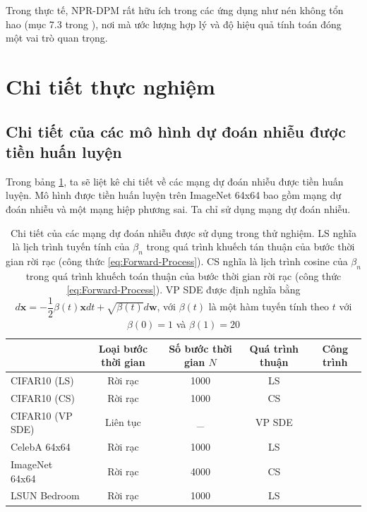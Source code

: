 \documentclass[14pt, a4paper]{article}
\numberwithin{equation}{section}
\numberwithin{figure}{section}
\numberwithin{dl}{section}
\numberwithin{md}{section}
\numberwithin{bd}{section}
\numberwithin{dn}{section}
\numberwithin{hq}{section}
\begin{document}
    Trong thực tế, NPR-DPM rất hữu ích trong các ứng dụng như nén không tổn hao (mục 7.3 trong \cite{kingma2021variational}),
    nơi mà ước lượng hợp lý và độ hiệu quả tính toán đóng một vai trò quan trọng.

    \section{Chi tiết thực nghiệm} \label{Experimental-Details}

    \subsection{Chi tiết của các mô hình dự đoán nhiễu được tiền huấn luyện}

    Trong bảng \ref{table:Details-of-Pretrained-Noise-Prediction-Network}, ta sẽ liệt kê chi tiết về các mạng dự đoán nhiễu được tiền huấn luyện.
    Mô hình được tiền huấn luyện trên ImageNet 64x64 bao gồm mạng dự đoán nhiễu và một mạng hiệp phương sai.
    Ta chỉ sử dụng mạng dự đoán nhiễu.

    \begin{table}[h!] 
        \caption{Chi tiết của các mạng dự đoán nhiễu được sử dụng trong thử nghiệm.
        LS nghĩa là lịch trình tuyến tính của $\beta_n$ trong quá trình khuếch tán thuận của bước thời gian rời rạc (công thức \ref{eq:Forward-Process}).
        CS nghĩa là lịch trình cosine của $\beta_n$ \cite{nichol2021improved} trong quá trình khuếch toán thuận của bước thời gian rời rạc (công thức \ref{eq:Forward-Process}).
        VP SDE được định nghĩa bằng $d \boldsymbol{x}=- \dfrac{1}{2} \beta(t) \boldsymbol{x} dt + \sqrt{\beta(t)} d \boldsymbol{w}$, với $\beta (t)$ là một hàm tuyến tính theo $t$ với $\beta(0)=1$ và $\beta(1)=20$ \cite{song2020score}}
        \begin{tabular}{l c c c c}
            \hline
            & Loại bước thời gian & Số bước thời gian $N$ & Quá trình thuận & Công trình \\
            \hline
            CIFAR10 (LS) & Rời rạc & 1000 & LS & \cite{bao2021analytic} \\
            CIFAR10 (CS) & Rời rạc & 1000 & CS & \cite{bao2021analytic} \\
            CIFAR10 (VP SDE) & Liên tục & \_ & VP SDE & \cite{song2020score} \\
            CelebA 64x64 & Rời rạc & 1000 & LS & \cite{song2020denoising} \\
            ImageNet 64x64 & Rời rạc & 4000 & CS & \cite{nichol2021improved} \\
            LSUN Bedroom & Rời rạc & 1000 & LS & \cite{ho2020denoising} \\
            \hline
        \end{tabular}
        \label{table:Details-of-Pretrained-Noise-Prediction-Network}
    \end{table}
\end{document}
